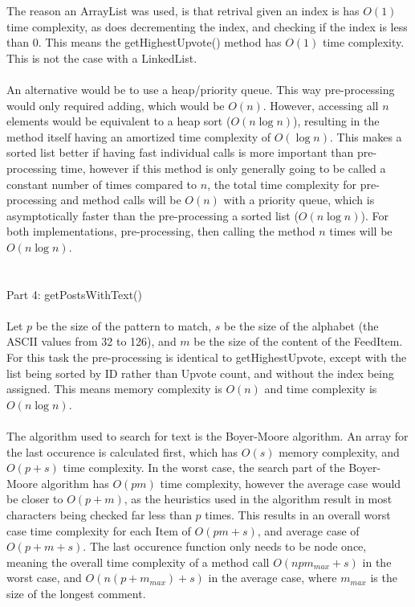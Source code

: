 \documentclass{article}
\begin{document}
	The reason an ArrayList was used, is that retrival given an index is has $O(1)$ time complexity, as does decrementing the index, and checking if the index is less than 0. This means the getHighestUpvote() method has $O(1)$ time complexity. This is not the case with a LinkedList. \\ \\
	An alternative would be to use a heap/priority queue. This way pre-processing would only required adding, which would be $O(n)$. However, accessing all $n$ elements would be equivalent to a heap sort ($O(n \log n)$), resulting in the method itself having an amortized time complexity of $O(\log n)$. This makes a sorted list better if having fast individual calls is more important than pre-processing time, however if this method is only generally going to be called a constant number of times compared to $n$, the total time complexity for pre-processing and method calls will be $O(n)$ with a priority queue, which is asymptotically faster than the pre-processing a sorted list ($O(n \log n)$). For both implementations, pre-processing, then calling the method $n$ times will be $O(n \log n)$.
	\\ \\ \\
	Part 4: getPostsWithText() \\ \\
	Let $p$ be the size of the pattern to match, $s$ be the size of the alphabet (the ASCII values from 32 to 126), and $m$ be the size of the content of the FeedItem. For this task the pre-processing is identical to getHighestUpvote, except with the list being sorted by ID rather than Upvote count, and without the index being assigned. This means memory complexity is $O(n)$ and time complexity is $O(n \log n)$. \\ \\
	The algorithm used to search for text is the Boyer-Moore algorithm. An array for the last occurence is calculated first, which has $O(s)$ memory complexity, and $O(p + s)$ time complexity. In the worst case, the search part of the Boyer-Moore algorithm has $O(pm)$ time complexity, however the average case would be closer to $O(p + m)$, as the heuristics used in the algorithm result in most characters being checked far less than $p$ times. This results in an overall worst case time complexity for each Item of $O(pm + s)$, and average case of $O(p + m + s)$. The last occurence function only needs to be node once, meaning the overall time complexity of a method call $O(npm_{max} + s)$ in the worst case, and $O(n(p + m_{max}) + s)$ in the average case, where $m_{max}$ is the size of the longest comment. \\ \\
\end{document}

